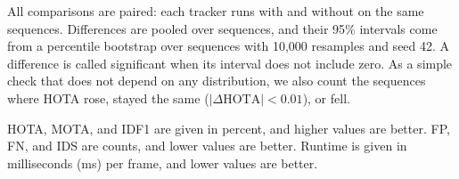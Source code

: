 

All comparisons are paired: each tracker runs with and without \scl{} on
the same sequences. Differences are pooled over sequences, and their 95\%
intervals come from a percentile bootstrap over sequences
\cite{efron1993bootstrap} with 10,000 resamples and seed 42. A difference is
called significant when its interval does not include zero. As a simple
check that does not depend on any distribution, we also count the sequences
where HOTA rose, stayed the same ($|\Delta\mathrm{HOTA}|<0.01$), or fell.

HOTA, MOTA, and IDF1 are given in percent, and higher values are better. FP,
FN, and IDS are counts, and lower values are better. Runtime is given in
milliseconds (ms) per frame, and lower values are better.
